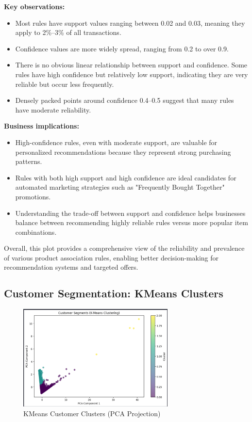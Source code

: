 \documentclass[12pt]{article}
\begin{document}
\vspace{0.4cm}

\textbf{Key observations:}
\begin{itemize}
    \item Most rules have support values ranging between 0.02 and 0.03, meaning they apply to 2\%–3\% of all transactions.
    \item Confidence values are more widely spread, ranging from 0.2 to over 0.9.
    \item There is no obvious linear relationship between support and confidence. Some rules have high confidence but relatively low support, indicating they are very reliable but occur less frequently.
    \item Densely packed points around confidence 0.4–0.5 suggest that many rules have moderate reliability.
\end{itemize}

\vspace{0.4cm}

\textbf{Business implications:}
\begin{itemize}
    \item High-confidence rules, even with moderate support, are valuable for personalized recommendations because they represent strong purchasing patterns.
    \item Rules with both high support and high confidence are ideal candidates for automated marketing strategies such as "Frequently Bought Together" promotions.
    \item Understanding the trade-off between support and confidence helps businesses balance between recommending highly reliable rules versus more popular item combinations.
\end{itemize}

\vspace{0.4cm}

Overall, this plot provides a comprehensive view of the reliability and prevalence of various product association rules, enabling better decision-making for recommendation systems and targeted offers.


\subsection{Customer Segmentation: KMeans Clusters}

\begin{figure}[H]
    \centering
    \includegraphics[width=0.7\textwidth]{images/customer_clusters_k_means.png}
    \caption{KMeans Customer Clusters (PCA Projection)}
\end{figure}
\end{document}
